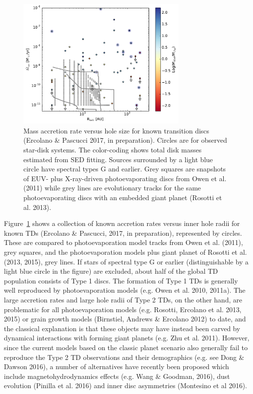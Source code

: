 \documentclass[10pt,fleqn,twoside]{article}
\begin{document}
\begin{figure}
\centerline{\includegraphics[width=0.75\textwidth]{Macc_Rhole_Mdisk.pdf}}
\caption{\label{fig-macc-rhole-mdisk}
  Mass accretion rate versus hole size for known transition
  discs (Ercolano \& Pascucci 2017, in preparation). Circles are for
  observed star-disk systems. The color-coding shows total disk masses
  estimated from SED fitting. Sources surrounded by a
  light blue circle have spectral types G and earlier. Grey squares
  are snapshots of EUV- plus X-ray-driven photoevaporating discs from
  Owen et al. (2011) while grey lines are evolutionary tracks for the
  same photoevaporating discs with an embedded giant planet (Rosotti 
  et al. 2013).} 
\end{figure}

Figure~\ref{fig-macc-rhole-mdisk} shows a collection of known accretion rates versus inner hole
radii for known TDs (Ercolano \& Pascucci, 2017, in preparation),
represented by circles. These are compared to photoevaporation model tracks from
Owen et al. (2011), grey squares, and the photoevaporation models plus giant planet
of Rosotti et al. (2013, 2015), grey lines. 
If stars of spectral type G or earlier (distinguishable by a light
blue circle in the figure) are excluded, about half of the global TD population consists of Type 1
discs. The formation of Type 1 TDs is generally well reproduced by
photoevaporation models (e.g. Owen et al. 2010, 2011a). The large accretion rates and large hole
radii of Type 2 TDs, on the other hand, are problematic for all 
photoevaporation models (e.g. Rosotti, Ercolano et al. 2013, 2015) or grain
growth models (Birnstiel, Andrews \& Ercolano 2012) to date, and the classical explanation is that
these objects may have instead been carved by dynamical interactions
with forming giant planets (e.g. Zhu et al. 2011). However, since the
current models based on the classic planet scenario also generally
fail to reproduce the Type 2 TD observations and 
their demographics (e.g. see Dong \& Dawson 2016),
a number of alternatives have recently been proposed which include magnetohydrodynamics
effects (e.g. Wang \& Goodman, 2016), dust evolution (Pinilla et
al. 2016) and inner disc asymmetries (Montesino et al 2016). 
\end{document}
